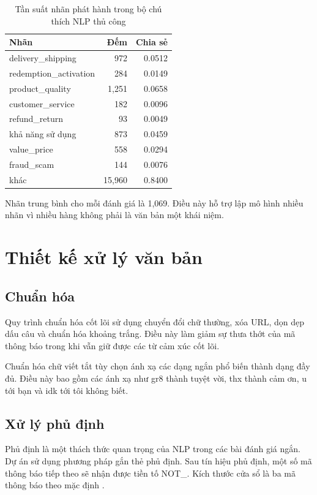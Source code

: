 \documentclass[12pt,a4paper]{article}
\begin{document}
\begin{table}[H]
\centering
\caption{Tần suất nhãn phát hành trong bộ chú thích NLP thủ công}
\label{tab:nlp_issue_frequency}
\begin{tabular}{lrr}
\toprule
Nhãn & Đếm & Chia sẻ \\
\midrule
delivery\_shipping & 972 & 0.0512 \\
redemption\_activation & 284 & 0.0149 \\
product\_quality & 1,251 & 0.0658 \\
customer\_service & 182 & 0.0096 \\
refund\_return & 93 & 0.0049 \\
khả năng sử dụng & 873 & 0.0459 \\
value\_price & 558 & 0.0294 \\
fraud\_scam & 144 & 0.0076 \\
khác & 15,960 & 0.8400 \\
\bottomrule
\end{tabular}
\end{table}

Nhãn trung bình cho mỗi đánh giá là 1,069. Điều này hỗ trợ lập mô hình nhiều nhãn vì nhiều hàng không phải là văn bản một khái niệm.

\section{Thiết kế xử lý văn bản}
\subsection{Chuẩn hóa}
Quy trình chuẩn hóa cốt lõi sử dụng chuyển đổi chữ thường, xóa URL, dọn dẹp dấu câu và chuẩn hóa khoảng trắng. Điều này làm giảm sự thưa thớt của mã thông báo trong khi vẫn giữ được các từ cảm xúc cốt lõi.

Chuẩn hóa chữ viết tắt tùy chọn ánh xạ các dạng ngắn phổ biến thành dạng đầy đủ. Điều này bao gồm các ánh xạ như gr8 thành tuyệt vời, thx thành cảm ơn, u tới bạn và idk tới tôi không biết.

\subsection{Xử lý phủ định}
Phủ định là một thách thức quan trọng của NLP trong các bài đánh giá ngắn. Dự án sử dụng phương pháp gắn thẻ phủ định. Sau tín hiệu phủ định, một số mã thông báo tiếp theo sẽ nhận được tiền tố NOT\_. Kích thước cửa sổ là ba mã thông báo theo mặc định \cite{wiegand2010}.
\end{document}
